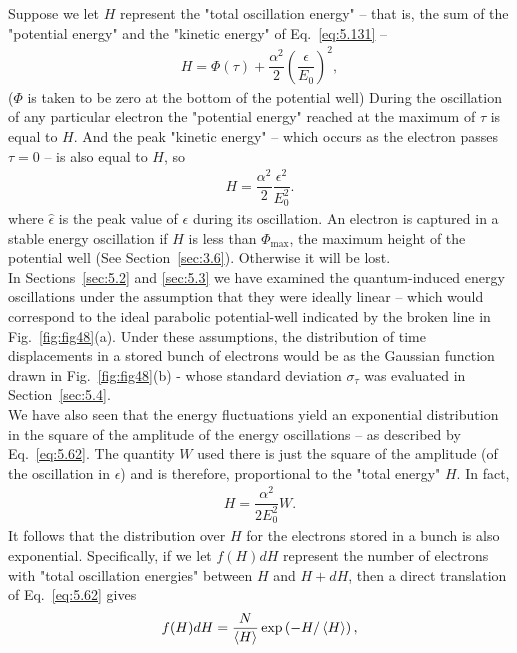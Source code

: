 Suppose we let $H$ represent the "total oscillation energy" -- that is, the sum of the "potential
 energy" and the "kinetic energy" of Eq.~\eqref{eq:5.131} --
\begin{align}
	H = \Phi(\tau) + \dfrac{\alpha^2}{2} \left( \dfrac{\epsilon}{E_0} \right)^2,
\end{align}
($\Phi$ is taken to be zero at the bottom of the potential well) During the oscillation of any particular electron the "potential energy" reached at the maximum of $\tau$ is equal to $H$. And the peak "kinetic energy" -- which occurs as the electron passes $\tau = 0$ -- is also equal to %
$H$, so
\begin{align}
	H = \dfrac{\alpha^2}{2} \dfrac{\epsilon^2}{E_0^2}.
\end{align}
where $\hat{\epsilon}$ is the peak value of $\epsilon$ during its oscillation. An electron is captured in a stable energy oscillation if $H$ is less than $\Phi_\text{max}$, the maximum height of the potential well (See Section~\ref{sec:3.6}). Otherwise it will be lost.\\
In Sections~\ref{sec:5.2} and \ref{sec:5.3} we have examined the quantum-induced energy oscillations under the assumption that they were ideally linear -- which would correspond to the ideal parabolic potential-well indicated by the broken line in Fig.~\ref{fig:fig48}(a). Under these assumptions, the distribution of time displacements in a stored bunch of electrons would be as the Gaussian function drawn in Fig.~\ref{fig:fig48}(b) - whose standard deviation $\sigma_\tau$ was evaluated in Section~\ref{sec:5.4}.\\
We have also seen that the energy fluctuations yield an exponential distribution in the square of the amplitude of the energy oscillations -- as described by Eq.~\eqref{eq:5.62}. The quantity $W$ used there is just the square of the amplitude (of the oscillation in $\epsilon$) and is therefore, proportional to the "total energy" $H$. In fact,
\begin{align}
	H = \dfrac{\alpha^2}{2 E_0^2}W.
\end{align}
It follows that the distribution over $H$ for the electrons stored in a bunch is also exponential. Specifically, if we let $f(H)dH$ represent the number of electrons with "total oscillation energies" between $H$ and $H + dH$, then a direct translation of Eq.~\eqref{eq:5.62} gives
\begin{align}
	f(H)dH = \dfrac{N}{\left< H \right>} \exp \left( -H/\left< H \right> \right),
\end{align}
